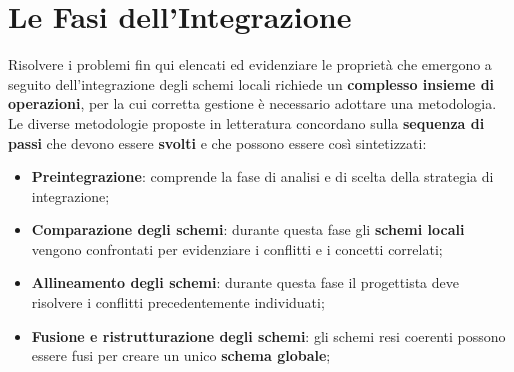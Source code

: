 \section{Le Fasi dell'Integrazione}\label{sec:db_le_fasi_dell_integrazione} %
Risolvere i problemi fin qui elencati ed evidenziare le proprietà che emergono a seguito dell'integrazione degli schemi locali richiede un \textbf{complesso insieme di operazioni}, per la cui corretta gestione è necessario adottare una metodologia.
Le diverse metodologie proposte in letteratura concordano sulla \textbf{sequenza di passi} che devono essere \textbf{svolti} e che possono essere così sintetizzati:
\begin{itemize}
    \item \textbf{Preintegrazione}: comprende la fase di analisi e di scelta della strategia di integrazione;
    \item \textbf{Comparazione degli schemi}: durante questa fase gli \textbf{schemi locali} vengono confrontati per evidenziare i conflitti e i concetti correlati;
    \item \textbf{Allineamento degli schemi}: durante questa fase il progettista deve risolvere i conflitti precedentemente individuati;
    \item \textbf{Fusione e ristrutturazione degli schemi}: gli schemi resi coerenti possono essere fusi per creare un unico \textbf{schema globale};
\end{itemize}
%
